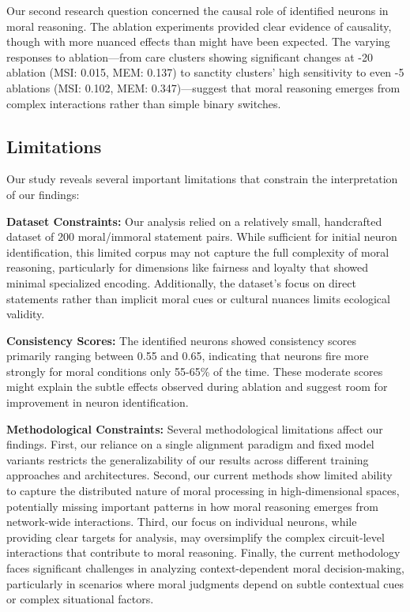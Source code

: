 \documentclass[runninghheads]{llncs}
\begin{document}
Our second research question concerned the causal role of identified neurons in moral reasoning. The ablation experiments provided clear evidence of causality, though with more nuanced effects than might have been expected. The varying responses to ablation—from care clusters showing significant changes at -20 ablation (MSI: 0.015, MEM: 0.137) to sanctity clusters' high sensitivity to even -5 ablations (MSI: 0.102, MEM: 0.347)—suggest that moral reasoning emerges from complex interactions rather than simple binary switches.

\subsection{Limitations}

Our study reveals several important limitations that constrain the interpretation of our findings:

\textbf{Dataset Constraints:} Our analysis relied on a relatively small, handcrafted dataset of 200 moral/immoral statement pairs. While sufficient for initial neuron identification, this limited corpus may not capture the full complexity of moral reasoning, particularly for dimensions like fairness and loyalty that showed minimal specialized encoding. Additionally, the dataset's focus on direct statements rather than implicit moral cues or cultural nuances limits ecological validity.

\textbf{Consistency Scores:} The identified neurons showed consistency scores primarily ranging between 0.55 and 0.65, indicating that neurons fire more strongly for moral conditions only 55-65\% of the time. These moderate scores might explain the subtle effects observed during ablation and suggest room for improvement in neuron identification.

\textbf{Methodological Constraints:} Several methodological limitations affect our findings. First, our reliance on a single alignment paradigm and fixed model variants restricts the generalizability of our results across different training approaches and architectures. Second, our current methods show limited ability to capture the distributed nature of moral processing in high-dimensional spaces, potentially missing important patterns in how moral reasoning emerges from network-wide interactions. Third, our focus on individual neurons, while providing clear targets for analysis, may oversimplify the complex circuit-level interactions that contribute to moral reasoning. Finally, the current methodology faces significant challenges in analyzing context-dependent moral decision-making, particularly in scenarios where moral judgments depend on subtle contextual cues or complex situational factors.
\end{document}
